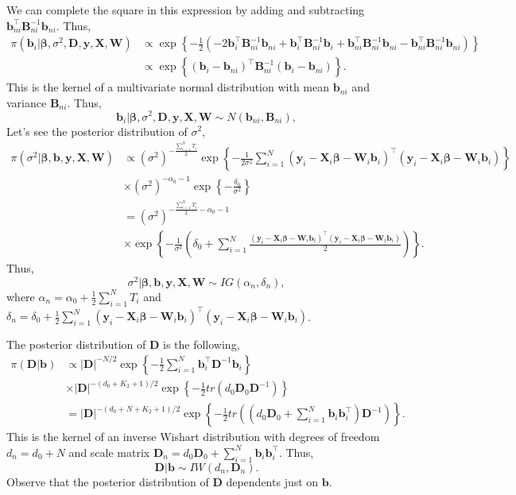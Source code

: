 We can complete the square in this expression by adding and subtracting $\bm{b}_{ni}^{\top}\bm{B}_{ni}^{-1}\bm{b}_{ni}$. Thus,
\begin{align*}
	\pi(\bm{b}_i|\bm{\beta},\sigma^2,\bm{D},\bm{y}, \bm{X}, \bm{W})&\propto \exp\left\{-\frac{1}{2}(-2\bm{b}_i^{\top}\bm{B}_{ni}^{-1}\bm{b}_{ni}+ \bm{b}_i^{\top}\bm{B}_{ni}^{-1}\bm{b}_i+\bm{b}_{ni}^{\top}\bm{B}_{ni}^{-1}\bm{b}_{ni}-\bm{b}_{ni}^{\top}\bm{B}_{ni}^{-1}\bm{b}_{ni})\right\}\\
	&\propto \exp\left\{(\bm{b}_i-\bm{b}_{ni})^{\top}\bm{B}_{ni}^{-1}(\bm{b}_i-\bm{b}_{ni})\right\}. 
\end{align*}
This is the kernel of a multivariate normal distribution with mean $\bm{b}_{ni}$ and variance $\bm{B}_{ni}$. Thus,
\begin{equation*}
	\bm{b}_i|\bm{\beta},\sigma^2,\bm{D},\bm{y}, \bm{X}, \bm{W} \sim {N}(\bm{b}_{ni},\bm{B}_{ni}), 
\end{equation*} 
Let's see the posterior distribution of $\sigma^2$,
\begin{align*}
	\pi(\sigma^2|\bm{\beta},\bm{b},\bm{y}, \bm{X}, \bm{W})&\propto (\sigma^2)^{-\frac{\sum_{i=1}^N T_i}{2}}\exp\left\{-\frac{1}{2\sigma^2}\sum_{i=1}^N(\bm{y}_i-\bm{X}_i\bm{\beta}-\bm{W}_i\bm{b}_i)^{\top}(\bm{y}_i-\bm{X}_i\bm{\beta}-\bm{W}_i\bm{b}_i)\right\}\\
	&\times (\sigma^2)^{-\alpha_0-1}\exp\left\{-\frac{\delta_0}{\sigma^2}\right\}\\
	&=(\sigma^2)^{-\frac{\sum_{i=1}^N T_i}{2}-\alpha_0-1}\\
	&\times \exp\left\{-\frac{1}{\sigma^2}\left(\delta_0+\sum_{i=1}^N\frac{(\bm{y}_i-\bm{X}_i\bm{\beta}-\bm{W}_i\bm{b}_i)^{\top}(\bm{y}_i-\bm{X}_i\bm{\beta}-\bm{W}_i\bm{b}_i)}{2}\right)\right\}. 
\end{align*}
Thus,
\begin{equation*}
	\sigma^2| \bm{\beta}, \bm{b}, \bm{y}, \bm{X}, \bm{W} \sim {I}{G}(\alpha_n, \delta_n),
\end{equation*}
where $\alpha_n=\alpha_0+\frac{1}{2}\sum_{i=1}^N T_i$ and $\delta_n=\delta_0+\frac{1}{2}\sum_{i=1}^N(\bm{y}_i-\bm{X}_i\bm{\beta}-\bm{W}_i\bm{b}_i)^{\top}(\bm{y}_i-\bm{X}_i\bm{\beta}-\bm{W}_i\bm{b}_i)$.

The posterior distribution of $\bm{D}$ is the following,
\begin{align*}
	\pi(\bm{D}|\bm{b})&\propto  |\bm{D}|^{-N/2} \exp\left\{-\frac{1}{2}\sum_{i=1}^N \bm{b}_i^{\top}\bm{D}^{-1}\bm{b}_i\right\}\\
	&\times |\bm{D}|^{-(d_0+K_2+1)/2}\exp\left\{-\frac{1}{2}tr(d_0\bm{D}_0\bm{D}^{-1})\right\}\\
	&=|\bm{D}|^{-(d_0+N+K_2+1)/2}\exp\left\{-\frac{1}{2}tr\left(\left(d_0\bm{D}_0+\sum_{i=1}^N\bm{b}_i\bm{b}_i^{\top}\right)\bm{D}^{-1}\right) \right\}. 
\end{align*}
This is the kernel of an inverse Wishart distribution with degrees of freedom $d_n=d_0+N$ and scale matrix $\bm{D}_n=d_0\bm{D}_0+\sum_{i=1}^N\bm{b}_i\bm{b}_i^{\top}$. Thus,   
\begin{equation*}
	\bm{D}| \bm{b} \sim {I}{W}(d_n, \bm{D}_n).
\end{equation*}
Observe that the posterior distribution of $\bm{D}$ dependents just on $\bm{b}$. 

